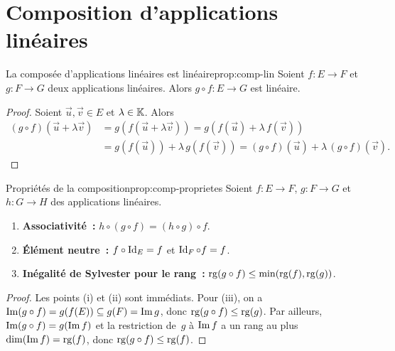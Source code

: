 \section{Composition d'applications linéaires}\label{sec:composition-al}

\begin{proposition}{La composée d'applications linéaires est linéaire}{prop:comp-lin}
  Soient $f\colon E\to F$ et $g\colon F\to G$ deux applications linéaires.
  Alors $g\circ f\colon E\to G$ est linéaire.
\end{proposition}

\begin{proof}
  Soient $\vec{u},\vec{v}\in E$ et $\lambda\in{\mathbb{K}}$. Alors
  \begin{align*}
    (g\circ f)(\vec{u}+\lambda\vec{v})
    &=g(f(\vec{u}+\lambda\vec{v}))
    =g(f(\vec{u})+\lambda\,f(\vec{v}))\\
    &=g(f(\vec{u}))+\lambda\,g(f(\vec{v}))
    =(g\circ f)(\vec{u})+\lambda\,(g\circ f)(\vec{v}).
  \end{align*}
\end{proof}

\begin{proposition}{Propriétés de la composition}{prop:comp-proprietes}
  Soient $f\colon E\to F$, $g\colon F\to G$ et $h\colon G\to H$ des
  applications linéaires.
  \begin{enumerate}[label=(\roman*)]
    \item \textbf{Associativité~:} $h\circ(g\circ f)=(h\circ g)\circ f$.
    \item \textbf{Élément neutre~:} $f\circ\operatorname{Id}_E=f$ et $\operatorname{Id}_F\circ f=f$.
    \item \textbf{Inégalité de Sylvester pour le rang~:}
      $\operatorname{rg}(g\circ f)\leq\min(\operatorname{rg}(f),\operatorname{rg}(g))$.
  \end{enumerate}
\end{proposition}

\begin{proof}
  Les points (i) et (ii) sont immédiats. Pour (iii), on a
  $\operatorname{Im}(g\circ f)=g(f(E))\subseteq g(F)=\operatorname{Im} g$, donc
  $\operatorname{rg}(g\circ f)\leq\operatorname{rg}(g)$. Par ailleurs, $\operatorname{Im}(g\circ f)=g(\operatorname{Im} f)$ et
  la restriction de~$g$ à $\operatorname{Im} f$ a un rang au plus $\dim(\operatorname{Im} f)=\operatorname{rg}(f)$,
  donc $\operatorname{rg}(g\circ f)\leq\operatorname{rg}(f)$.
\end{proof}

